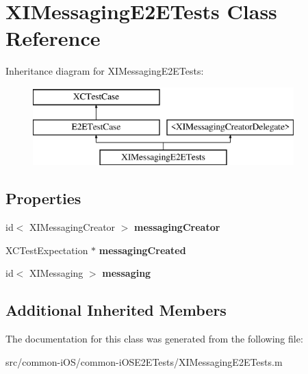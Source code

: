 \hypertarget{interface_x_i_messaging_e2_e_tests}{}\section{X\+I\+Messaging\+E2\+E\+Tests Class Reference}
\label{interface_x_i_messaging_e2_e_tests}
Inheritance diagram for X\+I\+Messaging\+E2\+E\+Tests\+:\begin{figure}[H]
\begin{center}
\leavevmode
\includegraphics[height=3.000000cm]{interface_x_i_messaging_e2_e_tests}
\end{center}
\end{figure}
\subsection*{Properties}
\begin{DoxyCompactItemize}
\item 
\hypertarget{interface_x_i_messaging_e2_e_tests_a66f7e511661285d24af54fec79506904}{}\label{interface_x_i_messaging_e2_e_tests_a66f7e511661285d24af54fec79506904} 
id$<$ X\+I\+Messaging\+Creator $>$ {\bfseries messaging\+Creator}
\item 
\hypertarget{interface_x_i_messaging_e2_e_tests_a31ed3a7509dc6133c2a1c42e5b1792ad}{}\label{interface_x_i_messaging_e2_e_tests_a31ed3a7509dc6133c2a1c42e5b1792ad} 
X\+C\+Test\+Expectation $\ast$ {\bfseries messaging\+Created}
\item 
\hypertarget{interface_x_i_messaging_e2_e_tests_a5fa0a9f599a05719a3fc37b819a668a4}{}\label{interface_x_i_messaging_e2_e_tests_a5fa0a9f599a05719a3fc37b819a668a4} 
id$<$ X\+I\+Messaging $>$ {\bfseries messaging}
\end{DoxyCompactItemize}
\subsection*{Additional Inherited Members}


The documentation for this class was generated from the following file\+:\begin{DoxyCompactItemize}
\item 
src/common-\/i\+O\+S/common-\/i\+O\+S\+E2\+E\+Tests/X\+I\+Messaging\+E2\+E\+Tests.\+m\end{DoxyCompactItemize}
